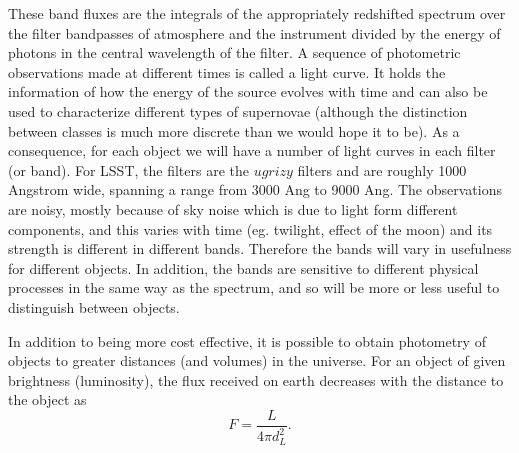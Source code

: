 \documentclass[\docopts]{\docclass}
\begin{document}
These band fluxes are the integrals of the appropriately redshifted spectrum over the filter bandpasses of atmosphere and the instrument divided by the energy of photons in the central wavelength of the filter. A sequence of photometric observations made at different times is called a light curve. It holds the information of how the energy of the source evolves with time and can also be used to characterize different types of supernovae (although the distinction between classes is much more discrete than we would hope it to be). As a consequence, for each object we will have a number of light curves in each filter (or band). For LSST, the filters are the $ugrizy$ filters and are roughly 1000 Angstrom wide, spanning a range from 3000 Ang to 9000 Ang. The observations are noisy, mostly because of sky noise which is due to light form different components, and this varies with time (eg. twilight, effect of the moon) and its strength is different in different bands. Therefore the bands will vary in usefulness for different objects. In addition, the bands are sensitive to different physical processes in the same way as the spectrum, and so will be more or less useful to distinguish between objects.

In addition to being more cost effective, it is possible to obtain photometry of objects to greater distances (and volumes) in the universe. For an object of given brightness (luminosity), the flux received on earth decreases with the distance to the object as
\begin{equation}
F = \frac{L}{4\pi d_L^2}.
\end{equation}





\end{document}
